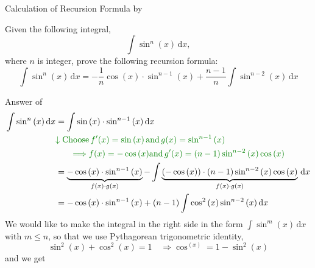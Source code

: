 \documentclass[10pt, aspectratio=1610]{beamer}
\begin{document}
\begin{frame}{Calculation of Recursion Formula by }\vspace{10pt}\label{slide:12}
  \begin{tcolorbox}[enhanced,colback=red!5!white,frame style={left color=red!75!black,right color=blue!75!black},rounded corners,title=Example]
    Given the following integral,
    \[\int \sin^{n}{(x)}\,\mathrm{d}x,\]
    where $n$ is integer, prove the following recursion formula:
    \begin{equation}\label{qe:5}
      \int \sin^{n}{(x)}\,\mathrm{d}x = -\frac{1}{n}\cos{(x)}\cdot \sin^{n-1}{(x)} 
      +\frac{n-1}{n}\int \sin^{n-2}{(x)}\,\mathrm{d}x
    \end{equation}
    \pause 
    \hfill
    \hyperlink{slide:13}{}
  \end{tcolorbox}
\end{frame}

\begin{frame}{Answer of }\vspace{4pt}\label{slide:13}
    \begin{align*}
      \int \sin^n{(x)}\,\mathrm{d}x &= \int \sin{(x)}\cdot \sin^{n-1}{(x)}\,\mathrm{d}x\\
      &\textcolor[rgb]{0.0,0.5,0.0}{\downarrow \text{Choose}\,f'(x)= \sin{(x)}\, \text{and}\, g(x)= \sin^{n-1}{(x)}}\\ 
      &\qquad \textcolor[rgb]{0.0,0.5,0.0}{\Longrightarrow f(x)= -\cos{(x)} \text{and}\, g'(x)=(n-1)\sin^{n-2}{(x)}\cos{(x)}}\\
      &= \underbrace{-\cos{(x)}\cdot \sin^{n-1}{(x)}}_{f(x)\cdot g(x)} - \int \underbrace{(-\cos{(x)})\cdot (n-1)\sin^{n-2}{(x)}\cos{(x)}}_{f(x)\cdot g(x)}\,\mathrm{d}x\\
      &= -\cos{(x)}\cdot \sin^{n-1}{(x)} + (n-1)\int \cos^2{(x)}\sin^{n-2}{(x)}\,\mathrm{d}x
    \end{align*}
    We would like to make the integral in the right side in the form $\int \sin^m{(x)}\,\mathrm{d}x$ with $m \leq n$,
    so that we use Pythagorean trigonometric identity,
    \[\sin^2{(x)}+\cos^2{(x)}=1 \quad \Longrightarrow \cos^{(x)} = 1- \sin^2{(x)}\]
    and we get 
    \hfill
    \hyperlink{slide:14}{}
\end{frame}
\end{document}
